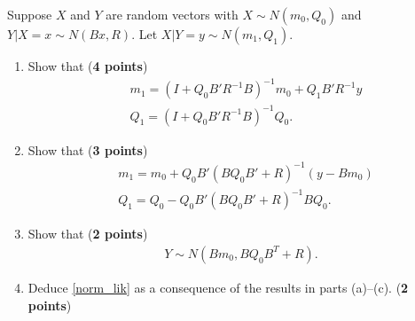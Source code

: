 \documentclass{scrartcl}
\begin{document}
\begin{enumerate}
Suppose $X$ and $Y$ are random
  vectors with $X \sim N(m_0, Q_0)$ and $Y | X = x \sim N(Bx, R)$. Let
  $X | Y = y \sim N(m_1, Q_1)$. 
  \begin{enumerate}
  \item Show that (\textbf{4 points})
    \begin{align*}
&      m_1 = (I + Q_0 B' R^{-1} B)^{-1} m_0 + Q_1 B' R^{-1} y \\ & Q_1
                                                                   =
                                                                   (I
                                                                   +
                                                                   Q_0
                                                                   B'
                                                                   R^{-1}
                                                                   B)^{-1}
                                                                   Q_0.  
    \end{align*}
  \item Show that (\textbf{3 points})
    \begin{align*}
      &m_1 = m_0 + Q_0 B' \left(B Q_0 B' + R \right)^{-1} (y - B m_0) \\
      &Q_1 = Q_0 - Q_0 B' \left(B Q_0 B' + R
      \right)^{-1} B Q_0. 
    \end{align*}
  \item Show that (\textbf{2 points})
    \begin{align*}
      Y \sim N(B m_0, BQ_0B^T + R). 
    \end{align*}
  \item Deduce \eqref{norm_lik} as a consequence of the results in
    parts (a)--(c). (\textbf{2 points})
  \end{enumerate}

\end{enumerate}
\end{document}
